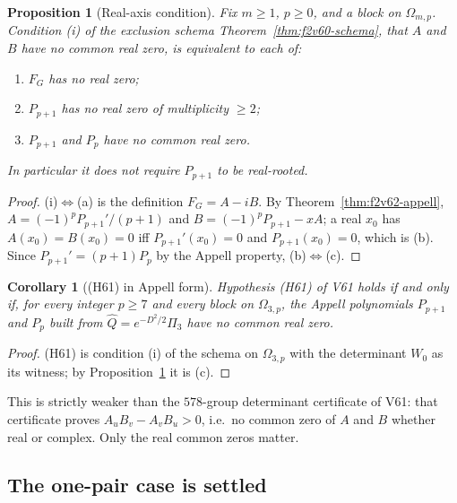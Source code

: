 \documentclass[11pt]{article}
\newtheorem{proposition}[theorem]{Proposition}
\newtheorem{corollary}[theorem]{Corollary}
\theoremstyle{definition}
\theoremstyle{remark}
\begin{document}
\begin{proposition}[Real-axis condition]
\label{prop:f2v63-criterion}
Fix \(m\ge1\), \(p\ge0\), and a block on \(\Omega_{m,p}\).  Condition
\textup{(i)} of the exclusion schema Theorem~\ref{thm:f2v60-schema},
that \(A\) and \(B\) have no common real zero, is equivalent to each of:
\begin{enumerate}[label=\textup{(\alph*)}]
\item \(F_G\) has no real zero;
\item \(P_{p+1}\) has no real zero of multiplicity \(\ge2\);
\item \(P_{p+1}\) and \(P_p\) have no common real zero.
\end{enumerate}
In particular it does \emph{not} require \(P_{p+1}\) to be real-rooted.
\end{proposition}

\begin{proof}
(i)\(\Leftrightarrow\)(a) is the definition \(F_G=A-iB\).  By
Theorem~\ref{thm:f2v62-appell}, \(A=(-1)^pP_{p+1}'/(p+1)\) and
\(B=(-1)^pP_{p+1}-xA\); a real \(x_0\) has \(A(x_0)=B(x_0)=0\) iff
\(P_{p+1}'(x_0)=0\) and \(P_{p+1}(x_0)=0\), which is (b).  Since
\(P_{p+1}'=(p+1)P_p\) by the Appell property, (b)\(\Leftrightarrow\)(c).
\end{proof}

\begin{corollary}[(H61) in Appell form]
\label{cor:f2v63-h61}
Hypothesis (H61) of V61 holds if and only if, for every integer
\(p\ge7\) and every block on \(\Omega_{3,p}\), the Appell polynomials
\(P_{p+1}\) and \(P_p\) built from \(\widehat Q=e^{-D^2/2}\Pi_3\) have no
common real zero.
\end{corollary}

\begin{proof}
(H61) is condition (i) of the schema on \(\Omega_{3,p}\) with the
determinant \(W_0\) as its witness; by
Proposition~\ref{prop:f2v63-criterion} it is (c).
\end{proof}

This is strictly weaker than the \(578\)-group determinant certificate of
V61: that certificate proves \(A_uB_v-A_vB_u>0\), i.e.\ no common zero
of \(A\) and \(B\) whether real or complex.  Only the real common zeros
matter.

\subsection{The one-pair case is settled}
\end{document}

